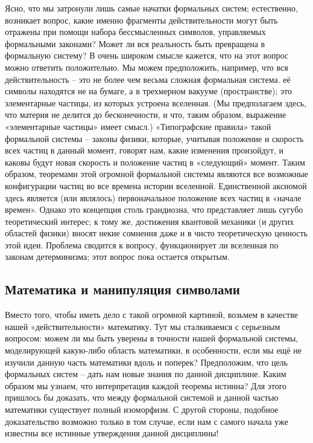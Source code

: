 \documentclass[../main.tex]{subfiles}
\begin{document}
Ясно, что мы затронули лишь самые начатки формальных систем; естественно, возникает вопрос, какие именно фрагменты действительности могут быть отражены при помощи набора бессмысленных символов, управляемых формальными законами? Может ли вся реальность быть превращена в формальную систему? В очень широком смысле кажется, что на этот вопрос можно ответить положительно. Мы можем предположить, например, что вся действительность \--- это не более чем весьма сложная формальная система. её символы находятся не на бумаге, а в трехмерном вакууме (пространстве); это элементарные частицы, из которых устроена вселенная. (Мы предполагаем здесь, что материя не делится до бесконечности, и что, таким образом, выражение «элементарные частицы» имеет смысл.) «Типографские правила» такой формальной системы \--- законы физики, которые, учитывая положение и скорость всех частиц в данный момент, говорят нам, какие изменения произойдут, и каковы будут новая скорость и положение частиц в «следующий» момент. Таким образом, теоремами этой огромной формальной системы являются все возможные конфигурации частиц во все времена истории вселенной. Единственной аксиомой здесь является (или являлось) первоначальное положение всех частиц в «начале времен». Однако это концепция столь грандиозна, что представляет лишь сугубо теоретический интерес; к тому же, достижения квантовой механики (и других областей физики) вносят некие сомнения даже и в чисто теоретическую ценность этой идеи. Проблема сводится к вопросу, функционирует ли вселенная по законам детерминизма; этот вопрос пока остается открытым.


\subsection{Математика и манипуляция символами}

Вместо того, чтобы иметь дело с такой огромной картиной, возьмем в качестве нашей «действительности» математику. Тут мы сталкиваемся с серьезным вопросом: можем ли мы быть уверены в точности нашей формальной системы, моделирующей какую-либо область математики, в особенности, если мы ещё не изучили данную часть математики вдоль и поперек? Предположим, что цель формальных систем \--- дать нам новые знания по данной дисциплине. Каким образом мы узнаем, что интерпретация каждой теоремы истинна? Для этого пришлось бы доказать, что между формальной системой и данной частью математики существует полный изоморфизм. С другой стороны, подобное доказательство возможно только в том случае, если нам с самого начала уже известны все истинные утверждения данной дисциплины!
\end{document}
